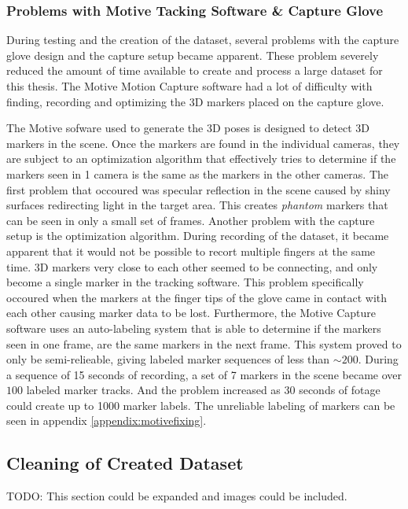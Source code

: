 \documentclass[../main.tex]{subfiles}
\begin{document}
\subsubsection{Problems with Motive Tacking Software \& Capture Glove}
\label{sec:motiveproblems}

During testing and the creation of the dataset, several problems with the capture glove design and the capture setup became apparent.
These problem severely reduced the amount of time available to create and process a large dataset for this thesis.
The Motive Motion Capture software \cite{motive} had a lot of difficulty with finding, recording and optimizing the 3D markers placed on the capture glove.

The  Motive sofware used to generate the 3D poses is designed to detect 3D markers in the scene.
Once the markers are found in the individual cameras, they are subject to an optimization algorithm that effectively tries to determine if the markers seen in 1 camera is the same as the markers in the other cameras.
The first problem that occoured was specular reflection in the scene caused by shiny surfaces redirecting light in the target area.
This creates \textit{phantom} markers that can be seen in only a small set of frames.
Another problem with the capture setup is the optimization algorithm.
During recording of the dataset, it became apparent that it would not be possible to recort multiple fingers at the same time.
3D markers very close to each other seemed to be connecting, and only become a single marker in the tracking software.
This problem specifically occoured when the markers at the finger tips of the glove came in contact with each other causing marker data to be lost.
Furthermore, the Motive Capture software uses an auto-labeling system that is able to determine if the markers seen in one frame, are the same markers in the next frame.
This system proved to only be semi-relieable, giving labeled marker sequences of less than $\sim 200$.
During a sequence of 15 seconds of recording, a set of 7 markers in the scene became over $100$ labeled marker tracks. And the problem increased as 30 seconds of fotage could create up to 1000 marker labels.
The unreliable labeling of markers can be seen in appendix \ref{appendix:motivefixing}.



\subsection{Cleaning of Created Dataset}
TODO: This section could be expanded and images could be included.
\end{document}
